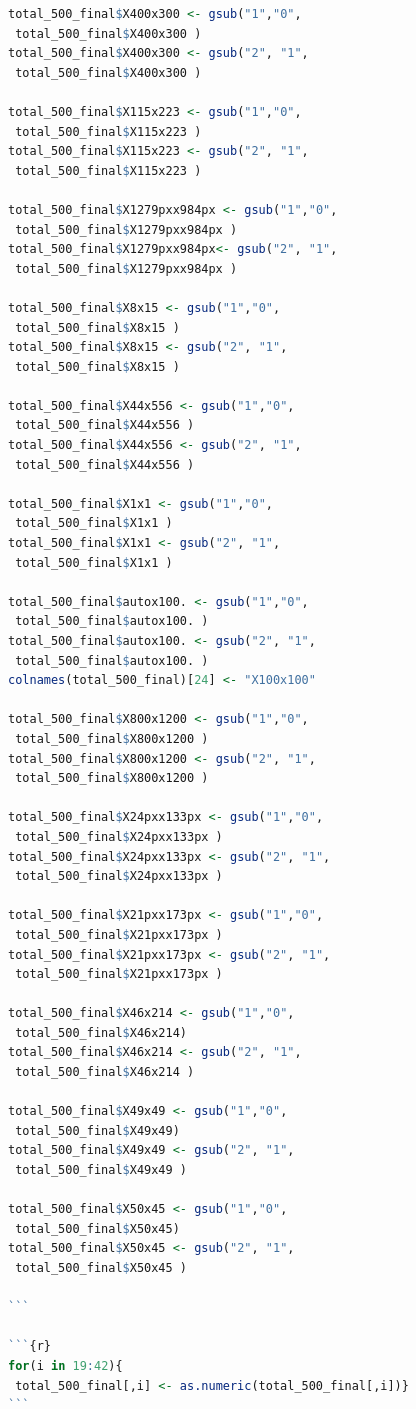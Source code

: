\documentclass{article}
\begin{document}
\begin{lstlisting}[language=R]
total_500_final$X400x300 <- gsub("1","0",
 total_500_final$X400x300 )
total_500_final$X400x300 <- gsub("2", "1",
 total_500_final$X400x300 )

total_500_final$X115x223 <- gsub("1","0",
 total_500_final$X115x223 )
total_500_final$X115x223 <- gsub("2", "1",
 total_500_final$X115x223 )

total_500_final$X1279pxx984px <- gsub("1","0",
 total_500_final$X1279pxx984px )
total_500_final$X1279pxx984px<- gsub("2", "1",
 total_500_final$X1279pxx984px )

total_500_final$X8x15 <- gsub("1","0",
 total_500_final$X8x15 )
total_500_final$X8x15 <- gsub("2", "1",
 total_500_final$X8x15 )

total_500_final$X44x556 <- gsub("1","0",
 total_500_final$X44x556 )
total_500_final$X44x556 <- gsub("2", "1",
 total_500_final$X44x556 )

total_500_final$X1x1 <- gsub("1","0",
 total_500_final$X1x1 )
total_500_final$X1x1 <- gsub("2", "1",
 total_500_final$X1x1 )

total_500_final$autox100. <- gsub("1","0",
 total_500_final$autox100. )
total_500_final$autox100. <- gsub("2", "1",
 total_500_final$autox100. )
colnames(total_500_final)[24] <- "X100x100"

total_500_final$X800x1200 <- gsub("1","0",
 total_500_final$X800x1200 )
total_500_final$X800x1200 <- gsub("2", "1",
 total_500_final$X800x1200 )

total_500_final$X24pxx133px <- gsub("1","0",
 total_500_final$X24pxx133px )
total_500_final$X24pxx133px <- gsub("2", "1",
 total_500_final$X24pxx133px )

total_500_final$X21pxx173px <- gsub("1","0",
 total_500_final$X21pxx173px )
total_500_final$X21pxx173px <- gsub("2", "1",
 total_500_final$X21pxx173px )

total_500_final$X46x214 <- gsub("1","0",
 total_500_final$X46x214)
total_500_final$X46x214 <- gsub("2", "1",
 total_500_final$X46x214 )

total_500_final$X49x49 <- gsub("1","0",
 total_500_final$X49x49)
total_500_final$X49x49 <- gsub("2", "1",
 total_500_final$X49x49 )

total_500_final$X50x45 <- gsub("1","0",
 total_500_final$X50x45)
total_500_final$X50x45 <- gsub("2", "1",
 total_500_final$X50x45 )

```

```{r}
for(i in 19:42){
 total_500_final[,i] <- as.numeric(total_500_final[,i])}  
```
\end{lstlisting} 
\end{document}
